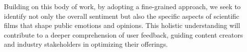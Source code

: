 Building on this body of work, %
by adopting a fine-grained approach, we seek to identify not only the overall sentiment but also the specific aspects of scientific films that shape public emotions and opinions. This holistic understanding will contribute to a deeper comprehension of user feedback, guiding content creators and industry stakeholders in optimizing their offerings.



